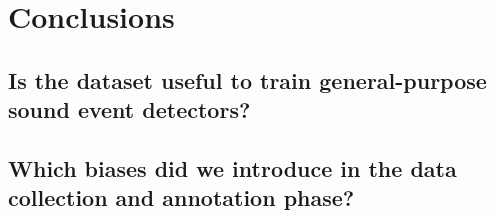 
\section{Conclusions}
\label{sec:Conclusions}


\subsection{Is the dataset useful to train general-purpose sound event detectors?}
\label{sec:Conclusions:a}


\subsection{Which biases did we introduce in the data collection and annotation phase?}
\label{sec:Conclusions:c}


